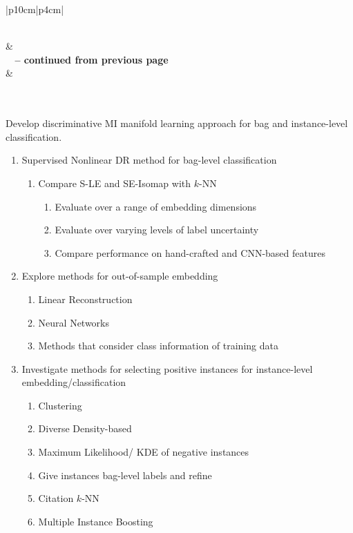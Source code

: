 \begin{longtable}{|p{10cm}|p{4cm}|} 
	\caption[List of Research Tasks]{List of research tasks and their corresponding estimated dates for completion.}
	\label{tab:future_tasks}\\
	\hline {} &  \\ \hline
	\endfirsthead
	{{\bfseries \tablename\ \thetable{} -- continued from previous page}} \\
	\hline {} &  
	\\
	\hline
	\endhead
	\hline {} \\ \hline
	\endfoot
	\hline \hline
	\endlastfoot


	 \\
	\hline
	Develop discriminative MI manifold learning approach for bag and instance-level classification. 
	\begin{enumerate}
		\item Supervised Nonlinear DR method for bag-level classification \label{item:supervisedDR_bag_level}
		\begin{enumerate}
			\item Compare S-LE and SE-Isomap  with $k$-NN
			\begin{enumerate}
				\item Evaluate over a range of embedding dimensions
				\item Evaluate over varying levels of label uncertainty
				\item Compare performance on hand-crafted and CNN-based features
			\end{enumerate}
		\end{enumerate}
	
		\item Explore methods for out-of-sample embedding
		\begin{enumerate}
			\item Linear Reconstruction
			\item Neural Networks
			\item Methods that consider class information of training data
		\end{enumerate}
		
		\item Investigate methods for selecting positive instances for instance-level  embedding/classification
		\begin{enumerate}
			\item Clustering
			\item Diverse Density-based
			\item Maximum Likelihood/ KDE of negative instances
			\item Give instances bag-level labels and refine
			\item Citation $k$-NN
			\item Multiple Instance Boosting
		\end{enumerate}
	

\end{enumerate}
\end{longtable}
